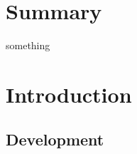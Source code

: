 \documentclass[11pt,singlespacinge,twoside]{reedthesis} %
\begin{document}
\hypertarget{summary}{%
\chapter*{Summary}\label{summary}}

something

\hypertarget{Intro}{%
\chapter{Introduction}\label{Intro}}

\setcounter{page}{1}

\hypertarget{development}{%
\section{Development}\label{development}}
\end{document}

